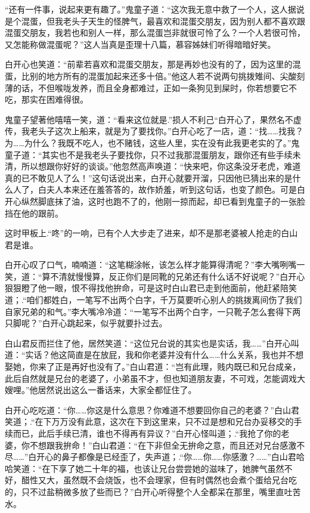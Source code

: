 \documentclass[12pt,oneside]{book}
\begin{document}
``还有一件事，说起来更有趣了。''鬼童子道：``这次我无意中救了一个人，这人据说是个混蛋，但我老头子天生的怪脾气，最喜欢和混蛋交朋友，因为别人都不喜欢跟混蛋交朋友，我若也和别人一样，那么混蛋岂非就很可怜了么？一个人若很可怜，又怎能称做混蛋呢？''这人当真是歪理十八篇，慕容姊妹们听得暗暗好笑。

白开心也笑道：``前辈若喜欢和混蛋交朋友，那是再妙也没有的了，因为这里的混蛋，比别的地方所有的混蛋加起来还多十倍。''他这人若不说两句挑拨雉间、尖酸刻薄的话，不但喉咙发养，而且全身都难过，正如一条狗见到屎时，你若想要它不吃，那实在困难得很。

鬼童子望著他嘻嘻一笑，道：``看来这位就是.''损人不利己``白开心了，果然名不虚传，我老头子这次上船来，就是为了要找你。''白开心吃了一店，道：``找\ldots\ldots 找我？为\ldots\ldots 为什么？我既不吃人，也不赌钱，这些人里，实在没有此我更老实的了。''鬼童子道：``其实也不是我老头子要找你，只不过我那混蛋朋友，跟你还有些手续未清，所以想跟你好好的谈谈。''他忽然高声唤道：``快来吧，你这条没牙老虎，难道真的已不敢见人了么！''这句话说出来，白开心就要开溜，只因他已猜出来的是什么人了，白夫人本来还在羞答答的，故作娇羞，听到这句话，也变了颜色。可是白开心纵然脚底抹了油，这时也跑不了的，他刚一掠而起，却已看到鬼童子的一张脸挡在他的跟前。

这时甲板上.``咚''的一响，已有个人大步走了进来，却不是那老婆被人抢走的白山君是谁。

白开心叹了口气，喃喃道：``这笔糊涂帐，该怎么样才能算得清呢？''李大嘴咧嘴一笑，道：``算不清就慢慢算，反正你们是同靴的兄弟还有什么话不好说呢？''白开心狠狠瞪了他一眼，恨不得找他拚命，可是这时白山君已走到他面前，他赶紧陪笑道；.``咱们都姓白，一笔写不出两个白字，千万莫要听心别人的挑拨离间伤了我们自家兄弟的和气。''李大嘴冷冷道：``一笔写不出两个白字，一只靴子怎么套得下两只脚呢？''白开心跳起来，似乎就要扑过去。

白山君反而拦住了他，居然笑道：``这位兄台说的其实也是实话，我\ldots\ldots{}''白开心叫道：``实话？他这简直是在放屁，我和你老婆并没有什么\ldots\ldots 什么关系，我也并不想娶她，你来了正是再好也没有了。''白山君道：``岂有此理，贱内既已和兄台成亲，此后自然就是兄台的老婆了，小弟虽不才，但也知道朋友妻，不可戏，怎能调戏大嫂哩。''他居然说出这么一番话来，大家全都怔住了。

白开心吃吃道：``你\ldots\ldots 你这是什么意思？你难道不想要回你自己的老婆？''白山君笑道；.``在下万万没有此意，这次在下到这里来，只不过是想和兄台办妥移交的手续而已，此后手续已清，谁也不得再有异议？''白开心怪叫道；.``我抢了你的老婆，你不想跟我拚命！''白山君道：``在下非但全无拚命之意，而且还对兄台感激不尽\ldots\ldots{}''白开心的鼻子都像是已经歪了，失声道；.``你\ldots\ldots 你\ldots\ldots 你感激？\ldots\ldots{}''白山君哈哈笑道：``在下享了她二十年的福，也该让兄台尝尝她的滋味了，她脾气虽然不好，醋性又大，虽然既不会烧饭，也不会理家，但有时偶然也会煮个蛋给兄台吃的，只不过盐稍微多放了些而已？''白开心听得整个人全都呆在那里，嘴里直吐苦水。
\end{document}
